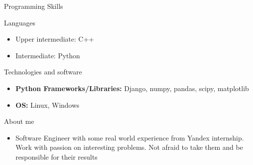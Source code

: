 \documentclass[]{mcdowellcv}
\begin{document}
	\begin{cvsection}{Programming Skills}
            \vskip 0.1cm
		\begin{cvsubsection}{Languages}{}{}
			\begin{itemize}
                            \item Upper intermediate: C++
                            \item Intermediate: Python
			\end{itemize}
		\end{cvsubsection}
                \begin{cvsubsection}{Technologies and software}{}{}
                    \begin{itemize}
                        \item \textbf{Python Frameworks/Libraries:} Django, numpy, pandas, scipy, matplotlib
                        \item \textbf{OS:} Linux, Windows
                    \end{itemize}
                \end{cvsubsection}
	\end{cvsection}

        \begin{cvsection}{About me}
            \vskip 0.1cm
            \begin{cvsubsection}{}{}{}
                \begin{itemize}
                    \item
                        Software Engineer with some real world experience from Yandex internship.
                        Work with passion on interesting
                        problems. Not afraid to take them and be responsible for their results
                \end{itemize}
            \end{cvsubsection}
        \end{cvsection}
\end{document}
